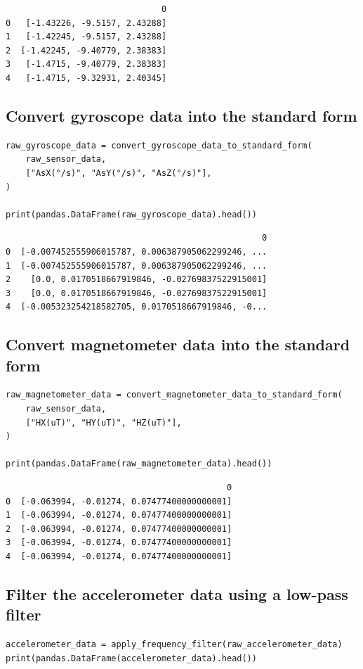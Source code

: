 \documentclass[12pt]{report}
\begin{document}
\label{orgce9da4a}
\begin{verbatim}
                               0
0   [-1.43226, -9.5157, 2.43288]
1   [-1.42245, -9.5157, 2.43288]
2  [-1.42245, -9.40779, 2.38383]
3   [-1.4715, -9.40779, 2.38383]
4   [-1.4715, -9.32931, 2.40345]
\end{verbatim}
\subsection{Convert gyroscope data into the standard form}
\label{sec:org09af43d}
\begin{verbatim}
raw_gyroscope_data = convert_gyroscope_data_to_standard_form(
    raw_sensor_data,
    ["AsX(°/s)", "AsY(°/s)", "AsZ(°/s)"],
)

print(pandas.DataFrame(raw_gyroscope_data).head())
\end{verbatim}

\label{org1688fb0}
\begin{verbatim}
                                                   0
0  [-0.007452555906015787, 0.006387905062299246, ...
1  [-0.007452555906015787, 0.006387905062299246, ...
2    [0.0, 0.0170518667919846, -0.02769837522915001]
3    [0.0, 0.0170518667919846, -0.02769837522915001]
4  [-0.005323254218582705, 0.0170518667919846, -0...
\end{verbatim}
\subsection{Convert magnetometer data into the standard form}
\label{sec:org571a80e}
\begin{verbatim}
raw_magnetometer_data = convert_magnetometer_data_to_standard_form(
    raw_sensor_data,
    ["HX(uT)", "HY(uT)", "HZ(uT)"],
)

print(pandas.DataFrame(raw_magnetometer_data).head())
\end{verbatim}

\label{orgda839e8}
\begin{verbatim}
                                            0
0  [-0.063994, -0.01274, 0.07477400000000001]
1  [-0.063994, -0.01274, 0.07477400000000001]
2  [-0.063994, -0.01274, 0.07477400000000001]
3  [-0.063994, -0.01274, 0.07477400000000001]
4  [-0.063994, -0.01274, 0.07477400000000001]
\end{verbatim}
\subsection{Filter the accelerometer data using a low-pass filter}
\label{sec:orgb7f89ce}
\begin{verbatim}
accelerometer_data = apply_frequency_filter(raw_accelerometer_data)
print(pandas.DataFrame(accelerometer_data).head())
\end{verbatim}
\end{document}
